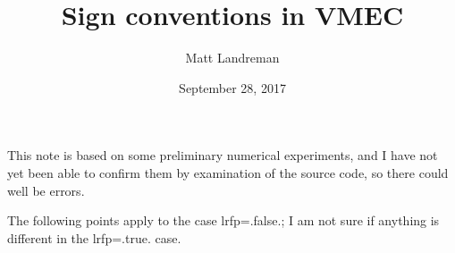 \documentclass[11pt,letter]{article}
\begin{document}
\title{Sign conventions in VMEC}





\author{Matt Landreman}


\date{September 28, 2017}
\maketitle %



This note is based on some preliminary numerical experiments, and I have not yet been able to confirm them by
examination of the source code, so there could well be errors.

The following points apply to the case {\ttfamily lrfp=.false.}; I am not sure if anything is different in the {\ttfamily lrfp=.true.} case.
\end{document}
